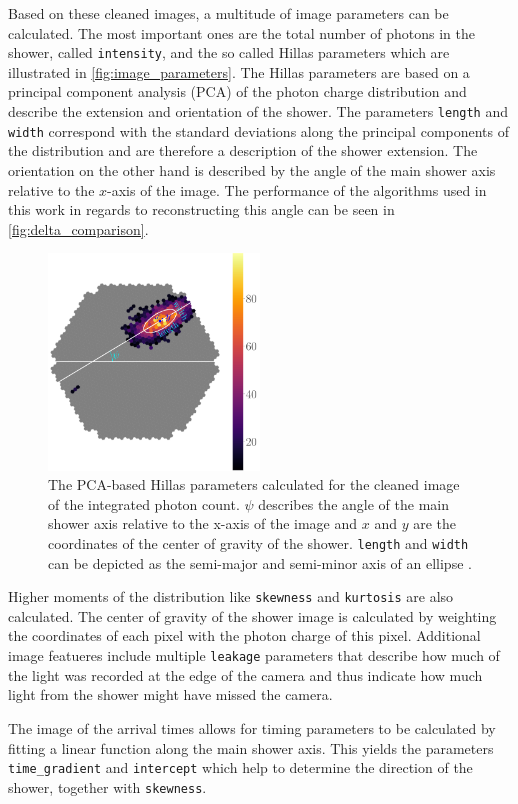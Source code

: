 Based on these cleaned images, a multitude of image parameters can be calculated.
The most important ones are the total number of photons in the shower, called \texttt{intensity}, and the so called Hillas parameters which are illustrated in \autoref{fig:image_parameters}.
The Hillas parameters are based on a principal component analysis (PCA) of the photon charge distribution and describe the extension and orientation of the shower.
The parameters \texttt{length} and \texttt{width} correspond with the standard deviations along the principal components of the distribution and are therefore a 
description of the shower extension. 
The orientation on the other hand is described by the angle of the main shower axis relative to the $x$-axis of the image.
The performance of the algorithms used in this work in regards to reconstructing this angle can be seen in \autoref{fig:delta_comparison}.
\begin{figure}
    \centering
    \includegraphics[width=0.5\textwidth]{images/image_parameters.png}
    \caption{The PCA-based Hillas parameters calculated for the cleaned image of the integrated photon count.
        $\psi$ describes the angle of the main shower axis relative to the x-axis of the image and $x$ and $y$ are the coordinates of the center of gravity of the shower. 
        \texttt{length} and \texttt{width} can be depicted as the semi-major and semi-minor axis of an ellipse \cite{lukas}.
    }
    \label{fig:image_parameters}
\end{figure}

Higher moments of the distribution like \texttt{skewness} and \texttt{kurtosis} are also calculated. 
The center of gravity of the shower image is calculated by weighting the coordinates of each pixel with the photon charge of this pixel.
Additional image featueres include multiple \texttt{leakage} parameters that describe how much of the light was recorded at the edge of the camera and 
thus indicate how much light from the shower might have missed the camera.

The image of the arrival times allows for timing parameters to be calculated by fitting a linear function along the main shower axis. 
This yields the parameters \texttt{time\_gradient} and \texttt{intercept} which help to determine the direction of the shower, together with \texttt{skewness}.